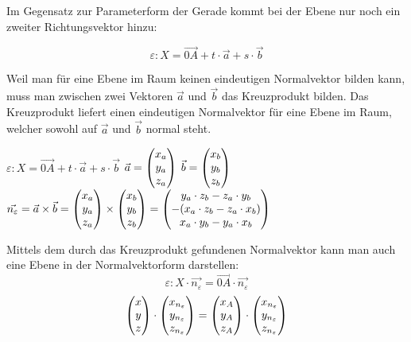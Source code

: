 
Im Gegensatz zur Parameterform der Gerade kommt bei der Ebene nur noch ein zweiter Richtungsvektor hinzu:

$$\varepsilon: X = \vec{0A} + t \cdot \vec{a} + s \cdot \vec{b}$$


Weil man f\"{u}r eine Ebene im Raum keinen eindeutigen Normalvektor bilden kann, muss man zwischen zwei Vektoren $\vec{a}$ und $\vec{b}$ das Kreuzprodukt bilden. Das Kreuzprodukt liefert einen eindeutigen Normalvektor f\"{u}r eine Ebene im Raum, welcher sowohl auf $\vec{a}$ und $\vec{b}$ normal steht.

\begin{center}
  $\varepsilon: X = \vec{0A} + t \cdot \vec{a} + s \cdot \vec{b}$
  \extrapar
  $ \vec{a} = \begin{pmatrix}x_{a}\\y_{a}\\z_{a}\end{pmatrix}$
  \extrapar
  $ \vec{b} = \begin{pmatrix}x_{b}\\y_{b}\\z_{b}\end{pmatrix}$
  \extrapar
  $ \vec{n_{\varepsilon}} 
    = \vec{a} \times \vec{b} 
    = \begin{pmatrix}x_{a}\\y_{a}\\z_{a}\end{pmatrix} \times \begin{pmatrix}x_{b}\\y_{b}\\z_{b}\end{pmatrix} 
    = \begin{pmatrix}y_{a} \cdot z_{b} - z_{a} \cdot y_{b}\\ - (x_{a} \cdot z_{b} - z_{a} \cdot x_{b})\\x_{a} \cdot y_{b} - y_{a} \cdot x_{b}\end{pmatrix}$  
\end{center}

\pagebreak


Mittels dem durch das Kreuzprodukt gefundenen Normalvektor kann man auch eine Ebene in der Normalvektorform darstellen: $$\varepsilon: X \cdot \vec{n_{\varepsilon}} = \vec{0A} \cdot \vec{n_{\varepsilon}}$$ $$\begin{pmatrix}x \\ y \\ z\end{pmatrix} \cdot \begin{pmatrix}x_{n_{\varepsilon}} \\ y_{n_{\varepsilon}} \\ z_{n_{\varepsilon}}\end{pmatrix} = \begin{pmatrix}x_{A} \\ y_{A} \\ z_{A}\end{pmatrix} \cdot \begin{pmatrix}x_{n_{\varepsilon}} \\ y_{n_{\varepsilon}} \\ z_{n_{\varepsilon}}\end{pmatrix}$$

